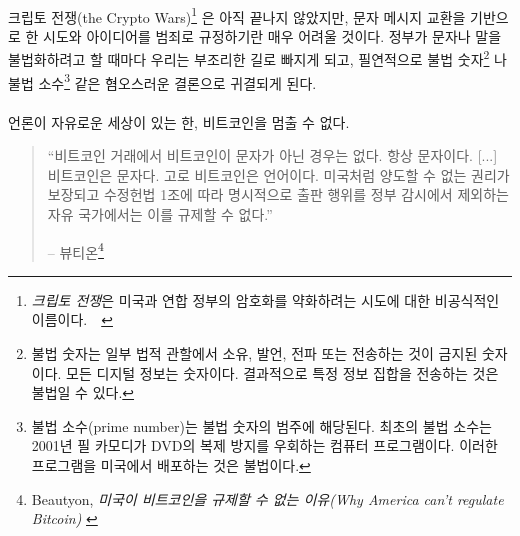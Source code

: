 \paragraph{}
크립토 전쟁(the Crypto Wars)\footnote{\textit{크립토 전쟁}은 미국과 연합 정부의 암호화를 약화하려는 시도에 대한 비공식적인 이름이다.~\cite{eff-cryptowars}~\cite{wiki:cryptowars}} 
은 아직 끝나지 않았지만, 문자 메시지 교환을 기반으로 한 시도와 아이디어를 범죄로 규정하기란 매우 어려울 것이다.
정부가 문자나 말을 불법화하려고 할 때마다 우리는 부조리한 길로 빠지게 되고, 필연적으로 
불법 숫자\footnote{불법 숫자는 일부 법적 관할에서 소유, 발언, 전파 또는 전송하는 것이 금지된 숫자이다. 모든 디지털 정보는 숫자이다.	결과적으로 특정 정보 집합을 전송하는 것은 불법일 수 있다.\cite{wiki:illegal-number}}
나 불법 소수\footnote{불법 소수(prime number)는 불법 숫자의 범주에 해당된다. 최초의 불법 소수는 2001년 필 카모디가 DVD의 복제 방지를 우회하는 컴퓨터 프로그램이다. 이러한 프로그램을 미국에서 배포하는 것은 불법이다.\cite{wiki:illegal-prime}}
 같은 혐오스러운 결론으로 귀결되게 된다.

\paragraph{}
언론이 자유로운 세상이 있는 한, 비트코인을 멈출 수 없다.

\begin{quotation}\begin{samepage}
		\enquote{비트코인 거래에서 비트코인이 문자가 아닌 경우는 없다. 항상 문자이다. [...]
			비트코인은 문자다. 고로 비트코인은 언어이다.
			미국처럼 양도할 수 없는 권리가 보장되고 수정헌법 1조에 따라 
			명시적으로 출판 행위를 정부 감시에서 제외하는 자유 국가에서는 이를 규제할 수 없다.}
		\begin{flushright} -- 뷰티온\footnote{Beautyon, \textit{미국이 비트코인을 규제할 수 없는 이유(Why America can't regulate Bitcoin)} \cite{america-regulate-bitcoin}}
\end{flushright}\end{samepage}\end{quotation}

